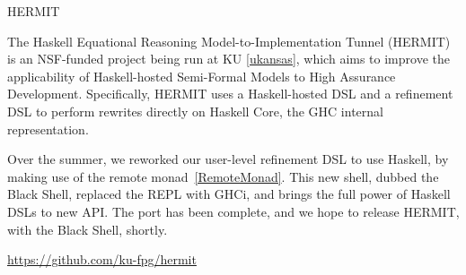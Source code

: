 \begin{hcarentry}[updated]{HERMIT}
\label{HERMIT}
\makeheader

The Haskell Equational Reasoning Model-to-Implementation Tunnel
(HERMIT) is an NSF-funded project being run at KU \cref{ukansas}, which aims to improve the
applicability of Haskell-hosted Semi-Formal Models to High Assurance Development.
Specifically, HERMIT uses a Haskell-hosted DSL
and a refinement DSL to perform rewrites directly on Haskell Core,
the GHC internal representation.

Over the summer, we reworked our user-level refinement DSL to use Haskell,
by making use of the remote monad~\cref{RemoteMonad}. This new
shell, dubbed the Black Shell, replaced the REPL with GHCi,
and brings the full power of Haskell DSLs to new API. The
port has been complete, and we hope to release HERMIT, with the Black Shell, shortly.

\FurtherReading
  \url{https://github.com/ku-fpg/hermit}
\end{hcarentry}
